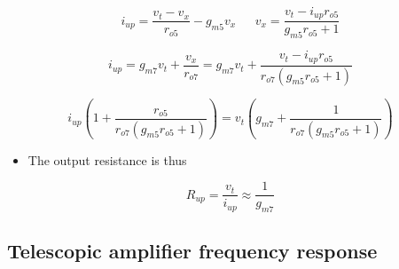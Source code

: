 \documentclass[11pt]{article}
\providecommand{\tightlist}{%
      \setlength{\itemsep}{0pt}\setlength{\parskip}{0pt}}
\begin{document}
    \begin{equation}
i_{up} = \dfrac{v_t - v_x}{r_{o5}} - g_{m5}v_x \:\:\:\:\:\:\: v_x = \dfrac{v_t - i_{up}r_{o5}}{g_{m5}r_{o5}+1}
\end{equation}

\begin{equation}
i_{up} = g_{m7}v_t+\dfrac{v_x}{r_{o7}} = g_{m7}v_t + \dfrac{v_t-i_{up}r_{o5}}{r_{o7}(g_{m5}r_{o5}+1)}
\end{equation}

\begin{equation}
i_{up}\left(1+\dfrac{r_{o5}}{r_{o7}(g_{m5}r_{o5}+1)}\right) = v_t\left(g_{m7}+\dfrac{1}{r_{o7}(g_{m5}r_{o5}+1)}\right)
\end{equation}

\begin{itemize}
\tightlist
\item
  The output resistance is thus
\end{itemize}

\begin{equation}
\boxed{R_{up} = \dfrac{v_t}{i_{up}}\approx \dfrac{1}{g_{m7}}}
\end{equation}

    \hypertarget{telescopic-amplifier-frequency-response}{%
\subsection{Telescopic amplifier frequency
response}\label{telescopic-amplifier-frequency-response}}
\end{document}
